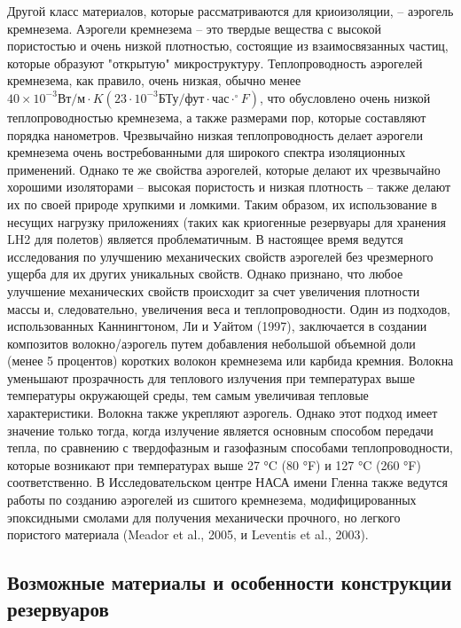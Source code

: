Другой класс материалов, которые рассматриваются для криоизоляции, -- аэрогель кремнезема. Аэрогели кремнезема -- это твердые вещества с высокой пористостью и очень низкой плотностью, состоящие из взаимосвязанных частиц, которые образуют "открытую" микроструктуру. Теплопроводность аэрогелей кремнезема, как правило, очень низкая, обычно менее \(40\times10^{-3} \text{Вт/м} \cdot K (23 \cdot 10^{-3} \text{БТу/фут} \cdot \text{час}\cdot ^{\circ}F) \), что обусловлено очень низкой теплопроводностью кремнезема, а также размерами пор, которые составляют порядка нанометров. Чрезвычайно низкая теплопроводность делает аэрогели кремнезема очень востребованными для широкого спектра изоляционных применений. Однако те же свойства аэрогелей, которые делают их чрезвычайно хорошими изоляторами -- высокая пористость и низкая плотность -- также делают их по своей природе хрупкими и ломкими. Таким образом, их использование в несущих нагрузку приложениях (таких как криогенные резервуары для хранения LH2 для полетов) является проблематичным. В настоящее время ведутся исследования по улучшению механических свойств аэрогелей без чрезмерного ущерба для их других уникальных свойств. Однако
признано, что любое улучшение механических свойств происходит за счет увеличения плотности массы и, следовательно, увеличения веса и теплопроводности. Один из подходов, использованных Каннингтоном, Ли и Уайтом (1997), заключается в создании композитов волокно/аэрогель путем добавления небольшой объемной доли (менее 5 процентов) коротких волокон кремнезема или карбида кремния. Волокна уменьшают прозрачность для теплового излучения при температурах выше температуры окружающей среды, тем самым увеличивая тепловые характеристики. Волокна также укрепляют аэрогель. Однако этот подход имеет значение только тогда, когда излучение является основным способом передачи тепла, по сравнению с твердофазным и газофазным способами теплопроводности, которые возникают при температурах выше 27 °C (80 °F) и 127 °C (260 °F) соответственно. В Исследовательском центре НАСА имени Гленна также ведутся работы по созданию аэрогелей из сшитого кремнезема, модифицированных эпоксидными смолами для получения механически прочного, но легкого пористого материала (Meador et al., 2005, и Leventis et al., 2003).


\subsection{Возможные материалы и особенности конструкции резервуаров}\label{ch:overview:1:sec4:sub2}

